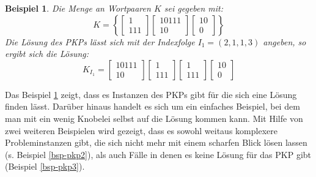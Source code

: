 \documentclass[]{scrartcl}
\newtheorem{bsp}[definition]{Beispiel}
\begin{document}
		\begin{bsp}
			\label{bsp-pkp1}
			Die Menge an Wortpaaren $K$ sei gegeben mit: \[K = \left\lbrace \begin{bmatrix}
					1 \\ 111
				\end{bmatrix}
				\begin{bmatrix}
					10111 \\ 10
				\end{bmatrix}
				\begin{bmatrix}
					10 \\ 0
				\end{bmatrix}\right\rbrace \]
				Die Lösung des PKPs lässt sich mit der Indexfolge $I_1 = (2, 1, 1, 3)$ angeben, so ergibt sich die Lösung:
				\[K_{I_1} = \begin{bmatrix}
								10111 \\ 10
							\end{bmatrix} \begin{bmatrix}
								1 \\ 111
							\end{bmatrix} \begin{bmatrix}
								1 \\ 111
							\end{bmatrix} \begin{bmatrix}
								10 \\ 0
							\end{bmatrix}\]
		\end{bsp}
		
		Das Beispiel \ref{bsp-pkp1} zeigt, dass es Instanzen des PKPs gibt für die sich eine Lösung finden lässt. Darüber hinaus handelt es sich um ein einfaches Beispiel, bei dem man mit ein wenig Knobelei selbst auf die Lösung kommen kann. Mit Hilfe von zwei weiteren Beispielen wird gezeigt, dass es sowohl weitaus komplexere Probleminstanzen gibt, die sich nicht mehr mit einem scharfen Blick lösen lassen (s. Beispiel \ref{bsp-pkp2}), als auch Fälle in denen es keine Lösung für das PKP gibt (Beispiel \ref{bsp-pkp3}).
		
\end{document}
